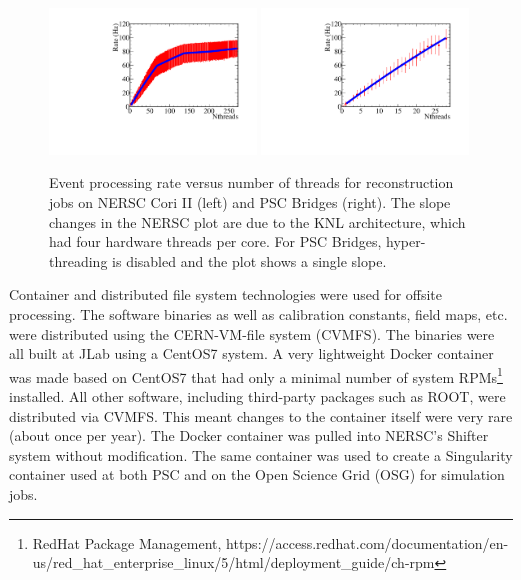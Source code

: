 \begin{figure}[htb]\centering
\includegraphics[width=0.49\textwidth]{figures/production_offsite_rate_vs_nthreads_NERSC.pdf}
\includegraphics[width=0.49\textwidth]{figures/production_offsite_rate_vs_nthreads_PSC.pdf}
\caption[]{\label{fig:production_offsite_rate_vs_nthreads_NERSC}Event processing rate versus number of threads for reconstruction jobs on NERSC Cori II (left) and PSC Bridges (right). The slope changes in the NERSC plot are due to the KNL architecture, which had four hardware threads per core. For PSC Bridges, hyper-threading is disabled and the plot shows a single slope.} 
\end{figure}

Container and distributed file system technologies were used for offsite processing. The software binaries as well as calibration constants, field maps, etc. were distributed using the CERN-VM-file system (CVMFS). 
The binaries were all built at JLab using a CentOS7 system. A very lightweight Docker container was made based on CentOS7 that had only a minimal number of system RPMs\footnote{RedHat Package Management, https://access.redhat.com/documentation/en-us/red\_hat\_enterprise\_linux/5/html/deployment\_guide/ch-rpm} installed. All other software, including third-party packages such as ROOT, were distributed via CVMFS. This meant changes to the container itself were very rare (about once per year). The Docker container was pulled into NERSC's Shifter system without modification. The same container was used to create a Singularity container used at both PSC and on the Open Science Grid (OSG) for simulation jobs.


